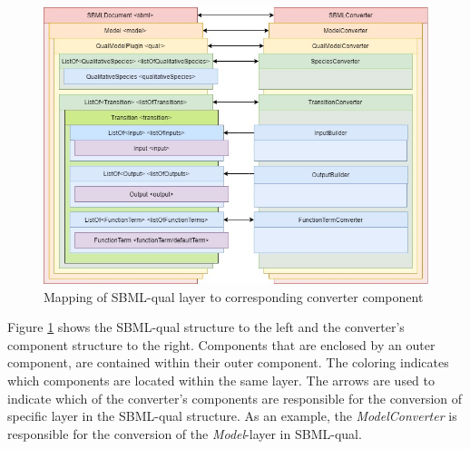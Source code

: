 
\begin{figure}[H]
    \centering
    \includegraphics[scale=0.45]{Sections/Images/ConverterLayering.jpg}
    \caption{Mapping of SBML-qual layer to corresponding converter component}
    \label{fig:converterLayering}
\end{figure}
Figure \ref{fig:converterLayering} shows the SBML-qual structure to the left and the converter's component structure to the right. Components that are enclosed by an outer component, are contained within their outer component. The coloring indicates which components are located within the same layer. The arrows are used to indicate which of the converter's components are responsible for the conversion of specific layer in the SBML-qual structure. As an example, the \emph{ModelConverter} is responsible for the conversion of the \emph{Model}-layer in SBML-qual.

